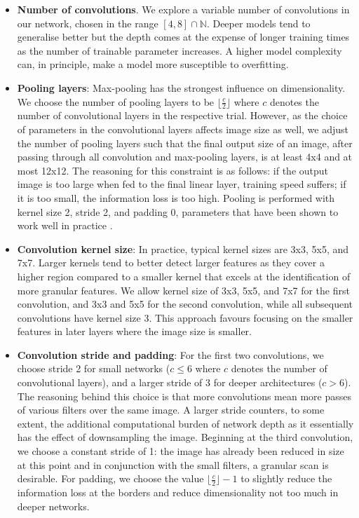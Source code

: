 \documentclass[british,12p]{article}
\begin{document}
    
    \begin{itemize}
    	\item \textbf{Number of convolutions}. We explore a variable number of convolutions in our network, chosen  in the range $[4, 8] \cap \mathbb{N}$. Deeper models tend to generalise better but the depth comes at the expense of longer training times as the number of trainable parameter increases. A higher model complexity can, in principle, make a model more susceptible to overfitting. 
    	\item \textbf{Pooling layers}: Max-pooling has the strongest influence on dimensionality. We choose the number of pooling layers to be $\lfloor \frac{c}{2}\rfloor$ where $c$ denotes the number of convolutional layers in the respective trial. However, as the choice of parameters in the convolutional layers affects image size as well, we adjust the number of pooling layers such that the final output size of an image, after passing through all convolution and max-pooling layers, is at least 4x4 and at most 12x12. The reasoning for this constraint is as follows: if the output image is too large when fed to the final linear layer, training speed suffers; if it is too small, the information loss is too high. Pooling is performed with kernel size 2, stride 2, and padding 0, parameters that have been shown to work well in practice \cite[p. 99]{buduma:17}.
    	\item \textbf{Convolution kernel size}: In practice, typical kernel sizes are 3x3, 5x5, and 7x7. Larger kernels tend to better detect larger features as they cover a higher region compared to a smaller kernel that excels at the identification of more granular features. We allow kernel size of 3x3, 5x5, and 7x7 for the first convolution, and 3x3 and 5x5 for the second convolution, while all subsequent convolutions have kernel size 3. This approach favours focusing on the smaller features in later layers where the image size is smaller.  
    	\item \textbf{Convolution stride and padding}: For the first two convolutions, we choose stride 2 for small networks ($c\le 6$ where $c$ denotes the number of convolutional layers), and a larger stride of 3 for deeper architectures ($c > 6$). The reasoning behind this choice is that more convolutions mean more passes of various filters over the same image. A larger stride counters, to some extent, the additional computational burden of network depth as it essentially has the effect of downsampling the image. Beginning at the third convolution, we choose a constant stride of 1: the image has already been reduced in size at this point and in conjunction with the small filters, a granular scan is desirable. For padding, we choose the value $\lfloor \frac{c}{2}\rfloor - 1$ to slightly reduce the information loss at the borders and reduce dimensionality not too much in deeper networks. 

\end{itemize}
\end{document}
